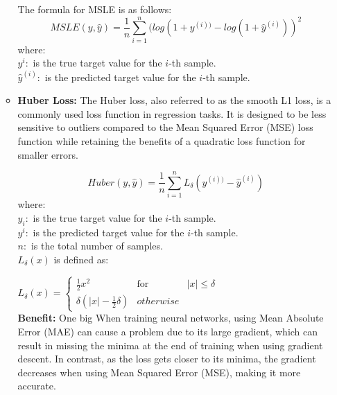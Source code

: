 \begin{itemize}
\begin{itemize}
    The formula for MSLE is as follows:
     $$MSLE(y,\hat{y})=\frac{1}{n}\sum_{i=1}^{n}(log(1+y^{(i))}-log(1+\hat{y}^{(i)}))^{2}$$
     where: \\
     $y^{i}: $ is the true target value for the \(i\)-th sample.\\
     $\hat{y}^{(i)}: $ is the predicted target value for the \(i\)-th sample.
     \item \textbf{Huber Loss: } The Huber loss, also referred to as the smooth L1 loss, is a commonly used loss function in regression tasks. It is designed to be less sensitive to outliers compared to the Mean Squared Error (MSE) loss function while retaining the benefits of a quadratic loss function for smaller errors.

     $$Huber(y,\hat{y})=\frac{1}{n}\sum_{i=1}^{n}L_{\delta}(y^{(i))}-\hat{y}^{(i)})$$
     where: \\
     $y_{i}: $ is the true target value for the \(i\)-th sample.\\
      $y^{i}: $ is the predicted target value for the \(i\)-th sample.\\
      $n: $ is the total number of samples.\\
      $L_{\delta}(x)$ is defined as:
      
      $L_{\delta}(x)=\left\{\begin{array}{rcl}
           \frac{1}{2}x^{2} & \mbox{for} & |x| \leq \delta \\
          \delta(|x|-\frac{1}{2}\delta) & otherwise 
      \end{array}\right.$\\
      \textbf{Benefit: } One big When training neural networks, using Mean Absolute Error (MAE) can cause a problem due to its large gradient, which can result in missing the minima at the end of training when using gradient descent. In contrast, as the loss gets closer to its minima, the gradient decreases when using Mean Squared Error (MSE), making it more accurate.
    

\end{itemize}
\end{itemize}
